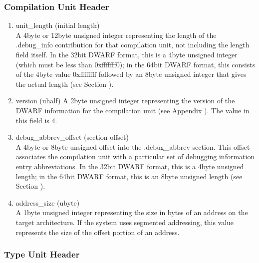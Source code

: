 \subsubsection{Compilation Unit Header}
\label{datarep:compilationunitheader}

\begin{enumerate}[1.]

\item unit\_length (initial length) \\
A 4\dash byte or 12\dash byte unsigned integer representing the length
of the .debug\_info contribution for that compilation unit,
not including the length field itself. In the 32\dash bit DWARF
format, this is a 4\dash byte unsigned integer (which must be less
than 0xfffffff0); in the 64\dash bit DWARF format, this consists
of the 4\dash byte value 0xffffffff followed by an 8\dash byte unsigned
integer that gives the actual length 
(see Section ).

\item  version (uhalf)
A 2\dash byte unsigned integer representing the version of the
DWARF information for the compilation unit 
(see Appendix ). 
The value in this field is 4.

\item debug\_abbrev\_offset (section offset) \\
A 4\dash byte or 8\dash byte unsigned offset into the .debug\_abbrev
section. This offset associates the compilation unit with a
particular set of debugging information entry abbreviations. In
the 32\dash bit DWARF format, this is a 4\dash byte unsigned length;
in the 64\dash bit DWARF format, this is an 8\dash byte unsigned length
(see Section ).

\item address\_size (ubyte) \\
A 1\dash byte unsigned integer representing the size in bytes of
an address on the target architecture. If the system uses
segmented addressing, this value represents the size of the
offset portion of an address.




\end{enumerate}

\subsubsection{Type Unit Header}
\label{datarep:typeunitheader}

